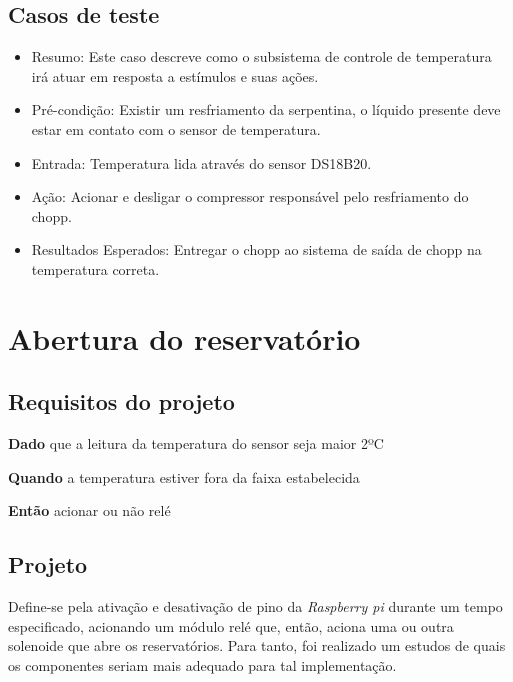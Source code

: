 \subsection{Casos de teste}

\begin{itemize}
    
    \item Resumo: Este caso descreve como o subsistema de controle de temperatura irá atuar em resposta a estímulos e suas ações.

    \item Pré-condição: Existir um resfriamento da serpentina, o líquido presente deve estar em contato com o sensor de temperatura.

    \item Entrada: Temperatura lida através do sensor DS18B20.

    \item Ação: Acionar e desligar o compressor responsável pelo resfriamento do chopp.

    \item Resultados Esperados: Entregar o chopp ao sistema de saída de chopp na temperatura correta.

\end{itemize}        
\newpage




\section{Abertura do reservatório}
\subsection{Requisitos do projeto}

\textbf{Dado} que a leitura da temperatura do sensor seja maior 2ºC

\textbf{Quando} a temperatura estiver fora da faixa estabelecida

\textbf{Então} acionar ou não relé


\subsection{Projeto}

Define-se pela ativação e desativação de pino da \textit{Raspberry pi}  durante um tempo especificado, 
acionando um módulo relé que, então, aciona uma ou outra solenoide que abre os reservatórios.
 Para tanto, foi realizado um estudos de quais  os componentes seriam mais adequado para tal 
 implementação.

